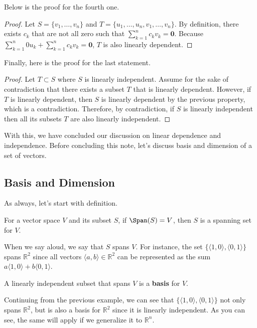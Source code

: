 \documentclass[../main.tex]{subfiles}
\begin{document}
Below is the proof for the fourth one.

\begin{proof}
Let $S = \{ v_1, \ldots, v_n \}$ and $T = \{ u_1, \ldots, u_n,
v_1, \ldots, v_n \}$. By definition, there exists $c_k$ that are
not all zero such that $\sum_{k = 1}^n c_k v_k = \mathbf{0}$.
Because $\sum_{k = 1}^n 0 u_k + \sum_{k = 1}^n c_k v_k = \mathbf{0}$,
$T$ is also linearly dependent.
\end{proof}

Finally, here is the proof for the last statement.

\begin{proof}
Let $T \subset S$ where $S$ is linearly independent. Assume for
the sake of contradiction that there exists a subset $T$ that is
linearly dependent. However, if $T$ is linearly dependent, then
$S$ is linearly dependent by the previous property, which is
a contradiction. Therefore, by contradiction, if $S$ is linearly
independent then all its subsets $T$ are also linearly independent.
\end{proof}

With this, we have concluded our discussion on linear dependence
and independence. Before concluding this note, let's discuss
basis and dimension of a set of vectors.

\subsection{Basis and Dimension}

As always, let's start with definition.

\begin{definition}
For a vector space $V$ and its subset $S$, if $\Span(S) = V$, then
$S$ is a spanning set for $V$.
\end{definition}

When we say aloud, we say that $S$ spans $V$. For instance, the set
$\{ \langle 1, 0 \rangle, \langle 0, 1 \rangle \}$ spans
$\mathbb{R}^2$ since all vectors $\langle a, b \rangle \in
\mathbb{R}^2$ can be represented as the sum $a \langle 1, 0 \rangle
+ b\langle 0, 1 \rangle$.

\begin{definition}
A linearly independent subset that spans $V$ is a \textbf{basis} for
$V$.
\end{definition}

Continuing from the previous example, we can see that $\{ \langle 1, 0
\rangle, \langle 0, 1 \rangle \}$ not only spans $\mathbb{R}^2$,
but is also a basis for $\mathbb{R}^2$ since it is linearly
independent. As you can see, the same will apply if we generalize it
to $\mathbb{R}^n$.
\end{document}
